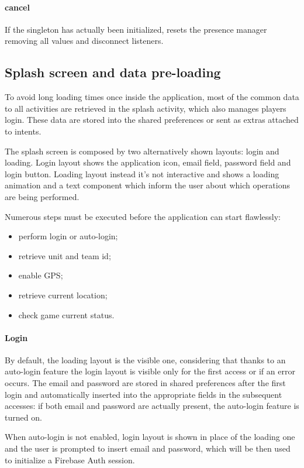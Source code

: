 			\paragraph{cancel}
			If the singleton has actually been initialized, resets the presence manager removing all values and disconnect listeners.
		
		\subsection{Splash screen and data pre-loading}\label{focus:splash}
		
			To avoid long loading times once inside the application, most of the common data to all activities are retrieved in the splash activity, which also manages players login.
			These data are stored into the shared preferences or sent as extras attached to intents.
			
			The splash screen is composed by two alternatively shown layouts: login and loading.
			Login layout shows the application icon, email field, password field and login button.
			Loading layout instead it's not interactive and shows a loading animation and a text component which inform the user about which operations are being performed.
			
			Numerous steps must be executed before the application can start flawlessly:
			\begin{itemize}
				\item perform login or auto-login;
				\item retrieve unit and team id;
				\item enable GPS;
				\item retrieve current location;
				\item check game current status.
			\end{itemize}
			
			\paragraph{Login}
			By default, the loading layout is the visible one, considering that thanks to an auto-login feature the login layout is visible only for the first access or if an error occurs.
			The email and password are stored in shared preferences after the first login and automatically inserted into the appropriate fields in the subsequent accesses: if both email and password are actually present, the auto-login feature is turned on.
			
			When auto-login is not enabled, login layout is shown in place of the loading one and the user is prompted to insert email and password, which will be then used to initialize a Firebase Auth session.
			
